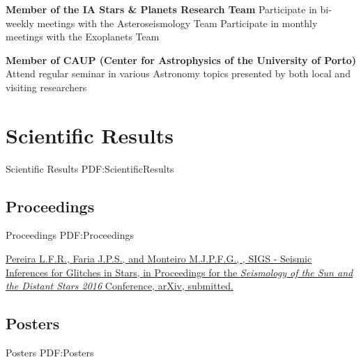 \documentclass[letterpaper,10pt,oneside]{article}
\begin{document}
\begin{body}
\BigGap
\textbf{Member of the IA Stars \& Planets Research Team}
\GapNoBreak
\BulletItem
Participate in bi-weekly meetings with the Asteroseismology Team
\GapNoBreak
\BulletItem
Participate in monthly meetings with the Exoplanets Team

\BigGap
\textbf{Member of CAUP (Center for Astrophysics of the University of Porto)}
\GapNoBreak
\BulletItem
Attend regular seminar in various Astronomy topics presented by both local and visiting researchers


\section
{Scientific Results}
{Scientific Results}
{PDF:ScientificResults}




\subsection
{Proceedings}
{Proceedings}
{PDF:Proceedings}

\GapNoBreak
{}
\href{}
{\underline{Pereira L.F.R.}, Faria J.P.S., and Monteiro M.J.P.F.G., 
, 
SIGS - Seismic Inferences for Glitches in Stars,
in Proceedings for the \textit{Seismology of the Sun and the Distant Stars 2016} Conference, \href{http://arxiv.org/abs/1703.04828} {arXiv}, submitted.}

\BigGap
\subsection
{Posters}
{Posters}
{PDF:Posters}


\end{body}
\end{document}
